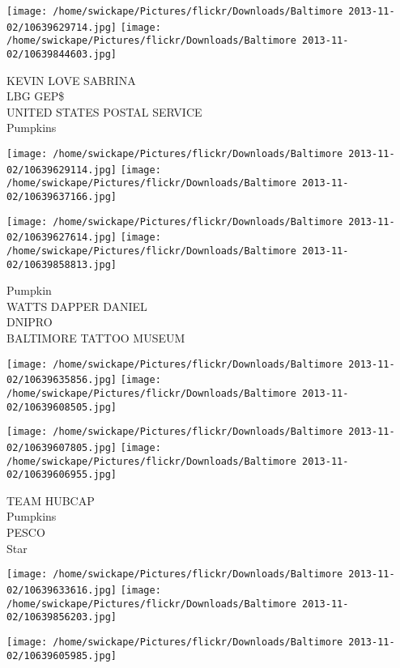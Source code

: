 \documentclass[10pt,letterpaper]{article}
\begin{document}
\texttt{[image: /home/swickape/Pictures/flickr/Downloads/Baltimore 2013-11-02/10639629714.jpg]}
\texttt{[image: /home/swickape/Pictures/flickr/Downloads/Baltimore 2013-11-02/10639844603.jpg]}

KEVIN LOVE SABRINA\\
LBG GEP\$\\
UNITED STATES POSTAL SERVICE\\
Pumpkins\\
\pagebreak

\texttt{[image: /home/swickape/Pictures/flickr/Downloads/Baltimore 2013-11-02/10639629114.jpg]}
\texttt{[image: /home/swickape/Pictures/flickr/Downloads/Baltimore 2013-11-02/10639637166.jpg]}

\texttt{[image: /home/swickape/Pictures/flickr/Downloads/Baltimore 2013-11-02/10639627614.jpg]}
\texttt{[image: /home/swickape/Pictures/flickr/Downloads/Baltimore 2013-11-02/10639858813.jpg]}

Pumpkin\\
WATTS DAPPER DANIEL\\
DNIPRO\\
BALTIMORE TATTOO MUSEUM\\
\pagebreak

\texttt{[image: /home/swickape/Pictures/flickr/Downloads/Baltimore 2013-11-02/10639635856.jpg]}
\texttt{[image: /home/swickape/Pictures/flickr/Downloads/Baltimore 2013-11-02/10639608505.jpg]}

\texttt{[image: /home/swickape/Pictures/flickr/Downloads/Baltimore 2013-11-02/10639607805.jpg]}
\texttt{[image: /home/swickape/Pictures/flickr/Downloads/Baltimore 2013-11-02/10639606955.jpg]}

TEAM HUBCAP\\
Pumpkins\\
PESCO\\
Star\\
\pagebreak

\texttt{[image: /home/swickape/Pictures/flickr/Downloads/Baltimore 2013-11-02/10639633616.jpg]}
\texttt{[image: /home/swickape/Pictures/flickr/Downloads/Baltimore 2013-11-02/10639856203.jpg]}

\vspace{0.25in}
\texttt{[image: /home/swickape/Pictures/flickr/Downloads/Baltimore 2013-11-02/10639605985.jpg]}
\end{document}
